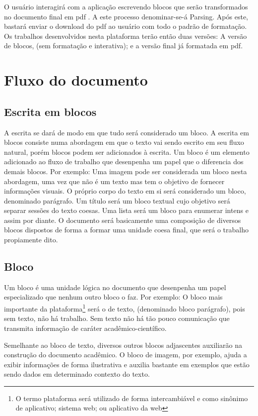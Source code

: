 O usuário interagirá com a aplicação escrevendo blocos que serão transformados
no documento final em
\acrshort{pdf}
. A este processo denominar-se-á Parsing. Após este, bastará
enviar o download do \acrshort{pdf}
ao usuário com todo o padrão de formatação. Os trabalhos desenvolvidos nesta plataforma
terão então duas versões: A versão de blocos, (sem formatação e interativa); e a versão
final já formatada em \acrshort{pdf}.

\section{Fluxo do documento}

\subsection{Escrita em blocos}

A escrita se dará de modo em que tudo será considerado um bloco.
A escrita em blocos consiste numa abordagem em que o texto vai sendo
escrito em seu fluxo natural, porém blocos podem ser adicionados à escrita.
Um bloco é um elemento adicionado ao fluxo de trabalho que desenpenha um papel
que o diferencia dos demais blocos.
Por exemplo: Uma imagem pode ser considerada um bloco nesta abordagem, uma vez
que não é um texto mas tem o objetivo de fornecer informações visuais. O próprio corpo
do texto em si será considerado um bloco, denominado parágrafo. Um título será um bloco
textual cujo objetivo será separar sessões do texto coesas. Uma lista será um bloco para enumerar
intens e assim por diante. O documento será basicamente uma composição de diversos blocos dispostos de forma a formar
uma unidade coesa final, que será o trabalho propiamente dito.

\subsection{Bloco}

Um bloco é uma unidade lógica no documento que desenpenha um papel especializado que nenhum
outro bloco o faz. Por exemplo: O bloco mais importante da
plataforma\footnote{O termo plataforma será utilizado
    de forma intercambiável e como sinônimo de aplicativo; sistema web; ou aplicativo da web}
será o de texto, (denominado bloco parágrafo), pois sem texto, não há trabalho.
Sem texto não há tão pouco comunicação que transmita informação
de caráter acadêmico-científico.

Semelhante ao bloco de texto, diversos outros blocos adjascentes
auxiliarão na construção do documento acadêmico. O bloco de imagem, por
exemplo, ajuda a exibir informações de forma ilustrativa e auxilia bastante
em exemplos que estão sendo dados em determinado contexto do texto.

